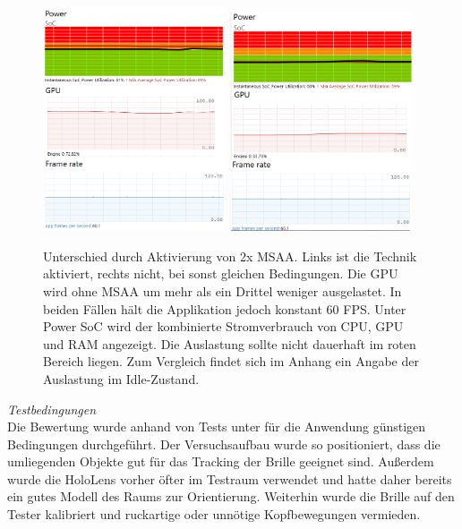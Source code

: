 \begin{figure}[h!]
	\centering
	\includegraphics[width=0.48\textwidth]{images/performance/perf_msaa_on_cut.png}
	\hspace{-0.05cm}
	\includegraphics[width=0.48\textwidth]{images/performance/perf_msaa_off_cut.png}
	\caption{Unterschied durch Aktivierung von 2x MSAA. Links ist die Technik aktiviert, rechts nicht, bei sonst gleichen Bedingungen. Die GPU wird ohne MSAA um mehr als ein Drittel weniger ausgelastet. In beiden Fällen hält die Applikation jedoch konstant 60 FPS. Unter Power SoC wird der kombinierte Stromverbrauch von CPU, GPU und RAM angezeigt. Die Auslastung sollte nicht dauerhaft im roten Bereich liegen. Zum Vergleich findet sich im Anhang ein Angabe der Auslastung im Idle-Zustand.}
	\label{img:msaa-vs-off}
\end{figure}


\textit{Testbedingungen}\\
Die Bewertung wurde anhand von Tests unter für die Anwendung günstigen Bedingungen durchgeführt. Der Versuchsaufbau wurde so positioniert, dass die umliegenden Objekte gut für das Tracking der Brille geeignet sind. Außerdem wurde die HoloLens vorher öfter im Testraum verwendet und hatte daher bereits ein gutes Modell des Raums zur Orientierung. Weiterhin wurde die Brille auf den Tester kalibriert und ruckartige oder unnötige Kopfbewegungen vermieden. 

